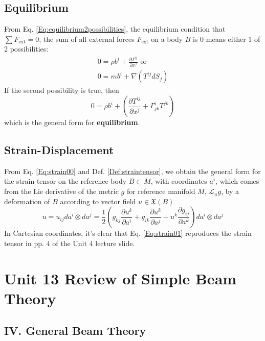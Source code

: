 \documentclass[twoside,landscape,10pt]{amsart}
\theoremstyle{plain}
\theoremstyle{definition}
\theoremstyle{remark}
\begin{document}
\begin{multicols*}{2}
\subsection{Equilibrium}

From Eq. \ref{Eq:equilibrium2possibilities}, the equilibrium condition that $\sum F_{\text{ext}}=0$, the sum of all external forces $F_{\text{ext}}$ on a body $B$ is $0$ means either 1 of 2 possibilities:
\[ 
 \begin{gathered}
0 = \rho b^i + \frac{ \partial T^{ij}}{ \partial x^j}  \text{ or } \\ 
0 =  mb^i + \nabla (T^{ij}dS_j)
\end{gathered}
\]
If the second possibility is true, then
\begin{equation}
\boxed{ 0 = \rho b^i + \left( \frac{ \partial T^{ij}}{ \partial x^j} + \Gamma^i_{jk} T^{jk} \right)  }
\end{equation}
which is the general form for \textbf{equilibrium}.  

\subsection{Strain-Displacement}

From Eq. \ref{Eq:strain00} and Def. \ref{Def:straintensor}, we obtain the general form for the strain tensor on the reference body $B\subset M$, with coordinates $a^i$, which comes from the Lie derivative of the metric $g$ for reference manifold $M$, $\mathcal{L}_ug$, by a deformation of $B$ according to vector field $u \in \mathfrak{X}(B)$ 
\begin{equation}\label{Eq:strain01}
u = u_{ij} da^i \otimes da^j = \frac{1}{2} \left( g_{kj} \frac{ \partial u^k}{ \partial a^i } + g_{ik} \frac{ \partial u^k}{ \partial a^j} + u^k \frac{ \partial g_{ij} }{ \partial a^k } \right) da^i \otimes da^j
\end{equation}
In Cartesian coordinates, it's clear that Eq. \ref{Eq:strain01} reproduces the strain tensor in pp. 4 of the Unit 4 lecture slide.  


\section*{Unit 13 Review of Simple Beam Theory}

\subsection*{IV. General Beam Theory}


\end{multicols*}
\end{document}
